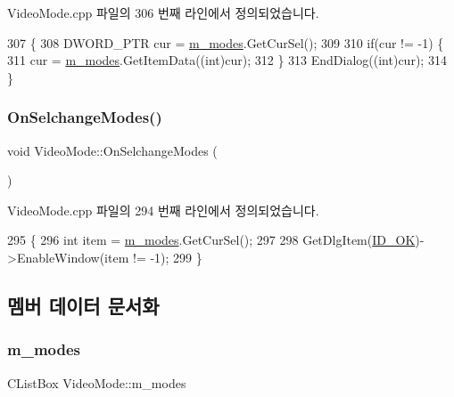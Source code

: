 Video\+Mode.\+cpp 파일의 306 번째 라인에서 정의되었습니다.


\begin{DoxyCode}
307 \{
308   DWORD\_PTR cur = \mbox{\hyperlink{class_video_mode_a89d4dd07ee169f0f6f4f845582fa3695}{m\_modes}}.GetCurSel();
309 
310   \textcolor{keywordflow}{if}(cur != -1) \{
311     cur = \mbox{\hyperlink{class_video_mode_a89d4dd07ee169f0f6f4f845582fa3695}{m\_modes}}.GetItemData((\textcolor{keywordtype}{int})cur);
312   \}
313   EndDialog((\textcolor{keywordtype}{int})cur);
314 \}
\end{DoxyCode}
\mbox{\label{class_video_mode_a8f9eece36c71ae9f171d53bf0cce9c68}} 
\subsubsection{\texorpdfstring{On\+Selchange\+Modes()}{OnSelchangeModes()}}
{\footnotesize\ttfamily void Video\+Mode\+::\+On\+Selchange\+Modes (\begin{DoxyParamCaption}{ }\end{DoxyParamCaption})\hspace{0.3cm}{\ttfamily [protected]}}



Video\+Mode.\+cpp 파일의 294 번째 라인에서 정의되었습니다.


\begin{DoxyCode}
295 \{
296   \textcolor{keywordtype}{int} item = \mbox{\hyperlink{class_video_mode_a89d4dd07ee169f0f6f4f845582fa3695}{m\_modes}}.GetCurSel();
297 
298   GetDlgItem(\mbox{\hyperlink{resource_8h_a4cf7b8af561e85b223c39c4c2b22ef18}{ID\_OK}})->EnableWindow(item != -1);
299 \}
\end{DoxyCode}


\subsection{멤버 데이터 문서화}
\mbox{\label{class_video_mode_a89d4dd07ee169f0f6f4f845582fa3695}} 
\subsubsection{\texorpdfstring{m\+\_\+modes}{m\_modes}}
{\footnotesize\ttfamily C\+List\+Box Video\+Mode\+::m\+\_\+modes}



